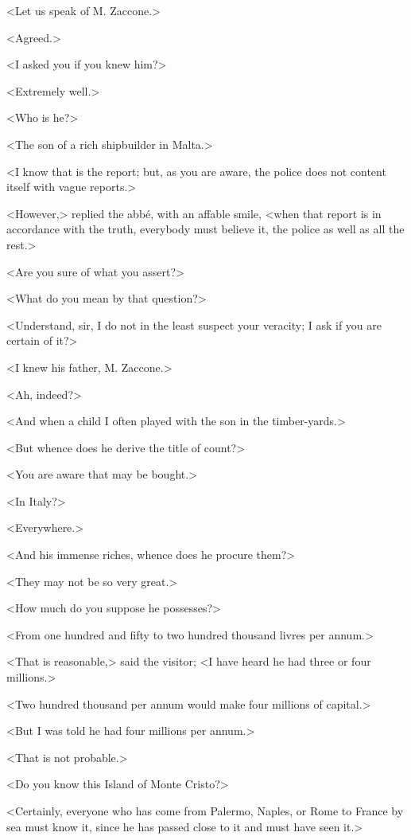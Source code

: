  <Let us speak of M. Zaccone.> 

 <Agreed.> 

 <I asked you if you knew him?> 

 <Extremely well.> 

 <Who is he?> 

 <The son of a rich shipbuilder in Malta.> 

 <I know that is the report; but, as you are aware, the police does not content itself with vague reports.> 

 <However,> replied the abbé, with an affable smile, <when that report is in accordance with the truth, everybody must believe it, the police as well as all the rest.> 

 <Are you sure of what you assert?> 

 <What do you mean by that question?> 

 <Understand, sir, I do not in the least suspect your veracity; I ask if you are certain of it?> 

 <I knew his father, M. Zaccone.> 

 <Ah, indeed?> 

 <And when a child I often played with the son in the timber-yards.> 

 <But whence does he derive the title of count?> 

 <You are aware that may be bought.> 

 <In Italy?> 

 <Everywhere.> 

 <And his immense riches, whence does he procure them?> 

 <They may not be so very great.> 

 <How much do you suppose he possesses?> 

 <From one hundred and fifty to two hundred thousand livres per annum.> 

 <That is reasonable,> said the visitor; <I have heard he had three or four millions.> 

 <Two hundred thousand per annum would make four millions of capital.> 

 <But I was told he had four millions per annum.> 

 <That is not probable.> 

 <Do you know this Island of Monte Cristo?> 

 <Certainly, everyone who has come from Palermo, Naples, or Rome to France by sea must know it, since he has passed close to it and must have seen it.> 

